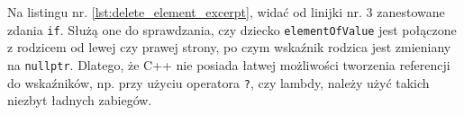Na listingu nr. \ref{lst:delete_element_excerpt}, widać od linijki nr. 3 zanestowane zdania \texttt{if}. Służą one do sprawdzania, czy dziecko \texttt{elementOfValue} jest połączone z rodzicem od lewej czy prawej strony, po czym wskaźnik rodzica jest zmieniany na \texttt{nullptr}. Dlatego, że C++ nie posiada łatwej możliwości tworzenia referencji do wskaźników, np. przy użyciu operatora \texttt{?}, czy lambdy, należy użyć takich niezbyt ładnych zabiegów.
